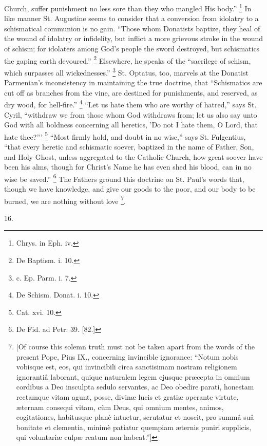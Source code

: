 Church, suffer punishment no less sore than they who
mangled His body.'' \footnote{Chrys. in Eph. iv.} In like manner St. Augustine
seems to consider that a conversion from idolatry to a
schismatical communion is no gain. ``Those whom
Donatists baptize, they heal of the wound of idolatry or
infidelity, but inflict a more grievous stroke in the
wound of schism; for idolaters among God's people the
sword destroyed, but schismatics the gaping earth
devoured.'' \footnote{De Baptism. i. 10.} Elsewhere, he speaks of the ``sacrilege of
schism, which surpasses all wickednesses.'' \footnote{c. Ep. Parm. i. 7.} St.
Optatus, too, marvels at the Donatist Parmenian's
inconsistency in maintaining the true doctrine, that
``Schismatics are cut off as branches from the vine,
are destined for punishments, and reserved, as dry wood,
for hell-fire.'' \footnote{De Schism. Donat. i. 10.} ``Let us hate them who
are worthy of hatred,'' says St. Cyril,
``withdraw we from those whom God withdraws from; let
us also say unto God with all boldness concerning all
heretics, 'Do not I hate them, O Lord, that hate
thee?''' \footnote{Cat. xvi. 10.} ``Most firmly hold, and doubt in no
wise,'' says St. Fulgentius, ``that every heretic
and schismatic soever, baptized in the name of Father,
Son, and Holy Ghost, unless aggregated to the Catholic
Church, how great soever have been his alms, though for
Christ's Name he has even shed his blood, can in no wise
be saved.'' \footnote{De Fid. ad Petr. 39. [82.]} The Fathers ground this doctrine on St. Paul's
words that, though we have knowledge, and give our goods
to the poor, and our body to be burned, we are nothing
without love \footnote{[Of course this solemn truth
must not be taken apart from the words of the present
Pope, Pius IX., concerning invincible ignorance:
``Notum nobis vobisque est, eos, qui invincibili
circa sanctisimam nostram religionem ignorantiâ
laborant, quique naturalem legem ejusque præcepta in
omnium cordibus a Deo insculpta sedulo servantes, ac Deo
obedire parati, honestam rectamque vitam agunt, posse, divinæ lucis et
gratiæ operante virtute, æternam
consequi vitam, cùm Deus, qui omnium mentes, animos,
cogitationes, habitusque planè intuetur, scrutatur et
noscit, pro summâ suâ bonitate et clementia, minimè
patiatur quempiam æternis puniri supplicis, qui voluntariæ culpæ reatum non habeat.'']}.

16.

